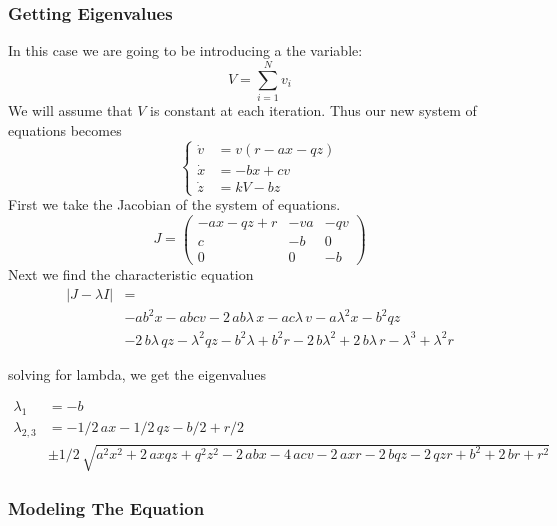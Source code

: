 \documentclass{article}
\begin{document}
\subsubsection{Getting Eigenvalues}
\label{sec:hiv2_evals}
In this case we are going to be introducing a the variable:
\[
V = \sum_{i = 1}^N v_i
\]
We will assume that $V$ is constant at each iteration. Thus our new system of equations becomes 
\begin{equation}
	\begin{cases}
		\dot v &= v(r - ax - qz) \\
		\dot x &= -bx + cv \\
		\dot z &= kV - bz
	\end{cases}
\end{equation}
First we take the Jacobian of the system of equations. 
\begin{equation}
    J=
    \begin{pmatrix}
        -ax-qz+r    &-va    &-qv    \\
        c           &-b     &0      \\
        0           &0       &-b
    \end{pmatrix}
\end{equation}
Next we find the characteristic equation
\begin{equation}
    \begin{split}
        | J - \lambda I | &= \\ 
        &-a{b}^{2}x-abcv-2\,ab\lambda\,x-ac\lambda\,v-a{\lambda}^{2}x-{b}^{2}qz \\
        &-2\,b\lambda\,qz-{\lambda}^{2}qz-{b}^{2}\lambda+{b}^{2}r-2\,b{\lambda}^{2}+2\,b\lambda\,r-{\lambda}^{3}+{\lambda}^{2}r
    \end{split}
\end{equation}

solving for lambda, we get the eigenvalues

\begin{equation}
    \begin{split}
        \lambda_1 &=  -b\\
        \lambda_{2,3} &= -1/2\,ax-1/2\,qz-b/2+r/2 \\
        &\pm 1/2\,\sqrt {{a}^{2}{x}^{2}+2\,axqz+{q}^{2}{z}^{2}-2\,abx-4\,acv-2\,axr-2\,bqz-2\,qzr+{b}^{2}+2\,br+{r}^{2}}         
    \end{split}
\end{equation}


\subsubsection{Modeling The Equation}
\end{document}
